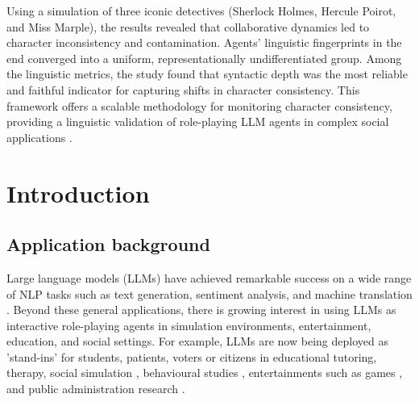 \documentclass{article}
\begin{document}
Using a simulation of three iconic detectives (Sherlock Holmes, Hercule Poirot, and Miss Marple), the results revealed that collaborative dynamics led to character inconsistency and contamination. Agents' linguistic fingerprints in the end converged into a uniform, representationally undifferentiated group. Among the linguistic metrics, the study found that syntactic depth was the most reliable and faithful indicator for capturing shifts in character consistency. This framework offers a scalable methodology for monitoring character consistency, providing a linguistic validation of role-playing LLM agents in complex social applications \footnotemark[1].



\newpage





\listoffigures
\listoftables


\newpage


\tableofcontents 

\newpage




\section{Introduction} \label{sec:introduction}

\subsection{Application background} \label{sec:intro_application_background}


Large language models (LLMs) have achieved remarkable success on a wide range of NLP tasks such as text generation, sentiment analysis, and machine translation \citep{ji2025enhancing,guo2024review}. Beyond these general applications, there is growing interest in using LLMs as interactive role-playing agents in simulation environments, entertainment, education, and social settings. For example, LLMs are now being deployed as 'stand-ins' for students, patients, voters or citizens in educational tutoring, therapy, social simulation \citep{park2022social, park2023generative}, behavioural studies \citep{aher2023using}, entertainments such as games \citep{xu2024survey}, and public administration research \citep{xiao2023simulating}. 
\end{document}
